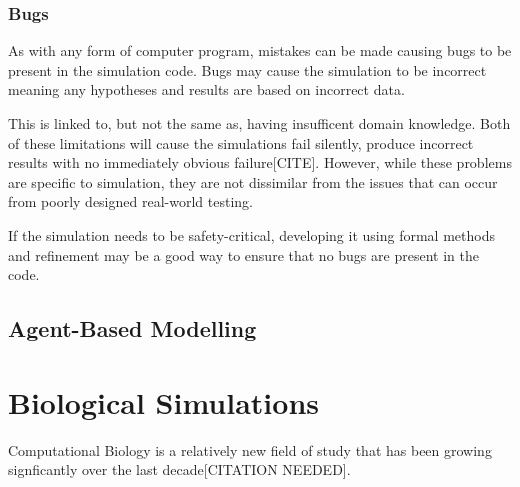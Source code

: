 \documentclass{UoYCSproject}
\begin{document}




\subsubsection{Bugs}
As with any form of computer program, mistakes can be made causing bugs to be present in the simulation code. Bugs may cause the simulation to be incorrect meaning any hypotheses and results are based on incorrect data.

This is linked to, but not the same as, having insufficent domain knowledge. Both of these limitations will cause the simulations fail silently, produce incorrect results with no immediately obvious failure[CITE]. However, while these problems are specific to simulation, they are not dissimilar from the issues that can occur from poorly designed real-world testing. %

If the simulation needs to be safety-critical, developing it using formal methods and refinement may be a good way to ensure that no bugs are present in the code.

\subsection{Agent-Based Modelling}
\label{abm}


\section{Biological Simulations}
Computational Biology is a relatively new field of study that has been growing signficantly over the last decade[CITATION NEEDED].
\end{document}
